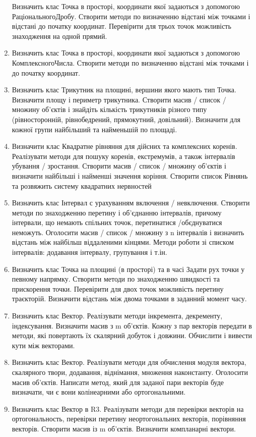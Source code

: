 \documentclass[]{article}
\begin{document}
\begin{enumerate}
Визначить клас Точка в просторі, координати якої задаються з допомогою РаціональногоДробу. Створити методи по визначенню відстані між точками і відстані до початку координат. Перевірити для трьох точок можливість знаходження на одной прямий.
\item
Визначить клас Точка в просторі, координати якої задаються з допомогою КомплексногоЧисла. Створити методи по визначенню відстані між точками і до початку координат.
\item
Визначить клас Трикутник на площині, вершини якого мають тип Точка. Визначити площу і периметр трикутника. Створити масив / список / множину об'єктів і знайдіть кількість трикутників різного типу (рівносторонній, рівнобедрений, прямокутний, довільний). Визначити для кожної групи найбільший та найменьшій по площаді.
\item
Визначити клас Квадратне рівняння для дійсних та комплексних коренів. Реалізувати методи для пошуку коренів, екстремумів, а також інтервалів убування / зростання. Створити масив / список / множину об'єктів і визначити найбільші і найменші значення коріння. Створити список Рівнянь та розвяжить систему квадратних нервностей
\item
Визначить клас Інтервал с урахуванням включення / невключення. Створити методи по знаходженню перетину і об'єднанню інтервалів, причому інтервали, що немають спільних точок, перетинатися /обєднуватися неможуть. Оголосити масив / список / множину з n інтервалів і визначить відстань між найбільш віддаленими кінцями. Методи роботи зі списком інтервалів: додавання інтервалу, групування і т.ін. 
\item
Визначить клас Точка на площині (в просторі) та в часі Задати рух точки у певному напрямку. Створити методи по знаходженню швидкості та прискорення точки. Перевірити для двох точок можливість перетину траєкторій. Визначити відстань між двома точками в заданний момент часу.
\item
Визначить клас Вектор. Реалізувати методи інкремента, декременту, індексування. Визначити масив з m об'єктів. Кожну з пар векторів передати в методи, які повертають їх скалярний добуток і довжини. Обчислити і вивести кути між векторами.
\item
Визначить клас Вектор. Реалізувати методи для обчислення модуля вектора, скалярного твори, додавання, віднімання, множення наконстанту. Оголосити масив об'єктів. Написати метод, який для заданої пари векторів буде визначати, чи є вони колінеарними або ортогональними.
\item
Визначить клас Вектор в R3. Реалізувати методи для перевірки векторів на ортогональность, перевірки перетину неортогональних векторів, порівняння векторів. Створити масив із m об'єктів. Визначити компланарні вектори.

\end{enumerate}
\end{document}
